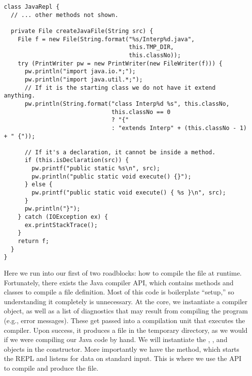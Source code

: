 \begin{cl}[]{}
\begin{lstlisting}[language=MyJava]
class JavaRepl {
  // ... other methods not shown.
  
  private File createJavaFile(String src) {
    File f = new File(String.format("%s/Interp%d.java",
                                    this.TMP_DIR, 
                                    this.classNo));
    try (PrintWriter pw = new PrintWriter(new FileWriter(f))) {
      pw.println("import java.io.*;");
      pw.println("import java.util.*;");
      // If it is the starting class we do not have it extend anything.
      pw.println(String.format("class Interp%d %s", this.classNo,
                               this.classNo == 0
                               ? "{" 
                               : "extends Interp" + (this.classNo - 1) + " {"));

      // If it's a declaration, it cannot be inside a method.
      if (this.isDeclaration(src)) {
        pw.printf("public static %s\n", src);
        pw.println("public static void execute() {}");
      } else {
        pw.printf("public static void execute() { %s }\n", src);
      }
      pw.println("}");
    } catch (IOException ex) {
      ex.printStackTrace();
    }
    return f;
  }
}
\end{lstlisting}
\end{cl}

Here we run into our first of two roadblocks: how to compile the file at runtime. Fortunately, there exists the Java compiler API, which contains methods and classes to compile a file definition. Most of this code is boilerplate ``setup,'' so understanding it completely is unnecessary. At the core, we instantiate a compiler object, as well as a list of diagnostics that may result from compiling the program (e.g., error messages). These get passed into a compilation unit that executes the compiler. Upon success, it produces a  file in the temporary directory, as we would if we were compiling our Java code by hand. We will instantiate the , , and  objects in the constructor. More importantly we have the  method, which starts the REPL and listens for data on standard input. This is where we use the API to compile and produce the  file.   


